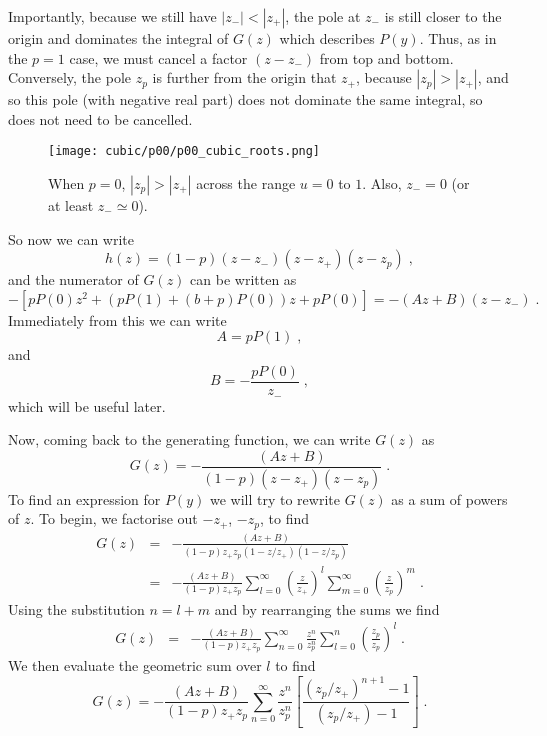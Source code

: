 \documentclass[a4paper,10pt]{article}
\begin{document}
Importantly, because we still have $|z_-| < |z_+|$, the pole at $z_-$ is still closer to the origin and dominates the integral of $G(z)$ which describes $P(y)$. Thus, as in the $p=1$ case, we must cancel a factor $(z-z_-)$ from top and bottom. Conversely, the pole $z_p$ is further from the origin that $z_+$, because $|z_p| > |z_+|$, and so this pole (with negative real part) does not dominate the same integral, so does not need to be cancelled. 

\begin{figure}[h!]
 \centering
 \texttt{[image: cubic/p00/p00\_cubic\_roots.png]}
 \caption{When $p=0$, $|z_p|>|z_+|$ across the range $u = 0 $ to $1$. Also, $z_- = 0$ (or at least $z_- \simeq 0$).}
 \label{fig:p00_cubic_roots}
\end{figure}


So now we can write
\begin{equation}
  h(z) = (1-p)(z-z_-)(z-z_+)(z-z_p)\;, 
\end{equation}
and the numerator of $G(z)$ can be written as
\begin{equation}
  - \left[ pP(0) z^2 + \left( pP(1) + (b+p)P(0) \right) z + pP(0) \right] = -(Az+B)(z-z_-) \;.
\end{equation}
Immediately from this we can write
\begin{equation}
  A = pP(1) \;, 
\end{equation}
and
\begin{equation}
  B = -\frac{pP(0)}{z_-} \;,
\end{equation}
which will be useful later.

Now, coming back to the generating function, we can write $G(z)$ as 
\begin{equation}
  G(z) = - \frac{(Az + B)}{(1-p)(z-z_+)(z-z_p)} \;.
\end{equation}
To find an expression for $P(y)$ we will try to rewrite $G(z)$ as a sum of powers of $z$. To begin, we factorise out $-z_+$, $-z_p$, to find
\begin{eqnarray}
  G(z) &=& - \frac{(Az + B)}{(1-p)z_+z_p(1-z/z_+)(1-z/z_p)} \nonumber \\
       &=& - \frac{(Az + B)}{(1-p)z_+z_p} \sum_{l=0}^\infty \left(\frac{z}{z_+}\right)^l \sum_{m=0}^\infty \left(\frac{z}{z_p}\right)^m \;. 
\end{eqnarray}
Using the substitution $n=l+m$ and by rearranging the sums we find
\begin{eqnarray}
  G(z) &=& - \frac{(Az + B)}{(1-p)z_+z_p} \sum_{n=0}^\infty \frac{z^n}{z_p^n} \sum_{l=0}^n \left(\frac{z_p}{z_p}\right)^l \;.
\end{eqnarray}
We then evaluate the geometric sum over $l$ to find
\begin{equation}
 G(z) = - \frac{(Az + B)}{(1-p)z_+z_p} \sum_{n=0}^\infty \frac{z^n}{z_p^n} \left[ \frac{ (z_p/z_+)^{n+1} -1 }{(z_p/z_+) - 1} \right] \;.
\end{equation}
\end{document}
